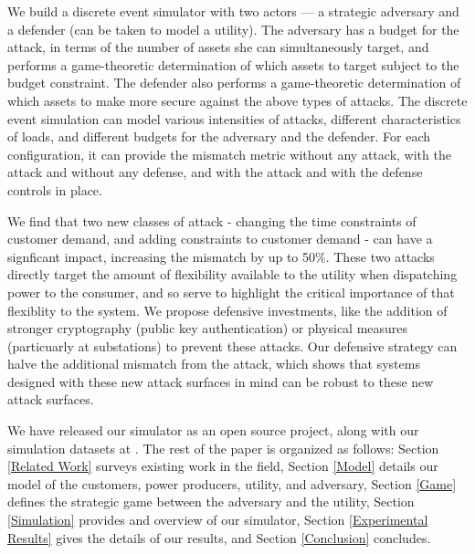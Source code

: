 \documentclass[conference]{IEEEtran}
\begin{document}
We build a discrete event simulator with two actors --- a strategic adversary and a defender (can be taken to model a utility). The adversary has a budget for the attack, in terms of the number of assets she can simultaneously target, and performs a game-theoretic determination of which assets to target subject to the budget constraint. The defender also performs a game-theoretic determination of which assets to make more secure against the above types of attacks. The discrete event simulation can model various intensities of attacks, different characteristics of loads, and different budgets for the adversary and the defender. For each configuration, it can provide the mismatch metric without any attack, with the attack and without any defense, and with the attack and with the defense controls in place. 

We find that two new classes of attack - changing the time constraints of customer demand, and adding constraints to customer demand - can have a signficant impact, increasing the mismatch by up to 50\%.  These two attacks directly target the amount of flexibility available to the utility when dispatching power to the consumer, and so serve to highlight the critical importance of that flexiblity to the system.  We propose defensive investments, like the addition of stronger cryptography (public key authentication) or physical measures (particuarly at substations) to prevent these attacks.  Our defensive strategy can halve the additional mismatch from the attack, which shows that systems designed with these new attack surfaces in mind can be robust to these new attack surfaces.  

We have released our simulator as an open source project, along with our simulation datasets at \cite{gridsec}.  The rest of the paper is organized as follows: Section \ref{Related Work} surveys existing work in the field, Section \ref{Model} details our model of the customers, power producers, utility, and adversary, Section \ref{Game} defines the strategic game between the adversary and the utility, Section \ref{Simulation} provides and overview of our simulator, Section \ref{Experimental Results} gives the details of our results, and Section \ref{Conclusion} concludes.

\end{document}
